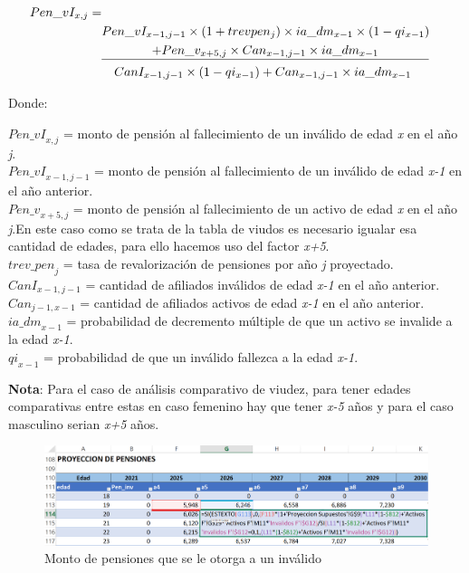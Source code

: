 \documentclass[
  letterpaper,
  DIV=11,
  numbers=noendperiod]{scrreprt}
\begin{document}
\begin{align}
Pen\_vI_{x,j} = \nonumber \\
& Pen\_vI_{x-1,j-1} \times \left (1+trevpen_j \right ) \times ia\_dm_{x-1}\times \left(1-qi_{x-1}\right) \nonumber \\
& \underline{\hspace{4 em}+Pen\_v_{x+5,j}\times Can_{x-1,j-1}\times ia\_dm_{x-1} \hspace{4 em}}\nonumber \\ 
&\hspace{1 em} CanI_{x-1,j-1}\times\left(1-qi_{x-1}\right)+Can_{x-1,j-1}\times ia\_dm_{x-1}
\end{align}

Donde:

\({Pen\_vI}_{x,j}\) = monto de pensión al fallecimiento de un inválido
de edad \emph{x} en el año \emph{j}.\\
\({Pen\_vI}_{x-1,j-1}\) = monto de pensión al fallecimiento de un
inválido de edad \emph{x-1} en el año anterior.\\
\({Pen\_v}_{x+5,j}\) = monto de pensión al fallecimiento de un activo de
edad \emph{x} en el año \emph{j}.En este caso como se trata de la tabla
de viudos es necesario igualar esa cantidad de edades, para ello hacemos
uso del factor \emph{x+5}.\\
\({trev\_{pen}}_j\) = tasa de revalorización de pensiones por año
\emph{j} proyectado.\\
\({CanI}_{x-1,j-1}\) = cantidad de afiliados inválidos de edad
\emph{x-1} en el año anterior.\\
\({Can}_{j-1,x-1}\) = cantidad de afiliados activos de edad \emph{x-1}
en el año anterior.\\
\({ia\_dm}_{x-1}\) = probabilidad de decremento múltiple de que un
activo se invalide a la edad \emph{x-1}.\\
\({qi}_{x-1}\) = probabilidad de que un inválido fallezca a la edad
\emph{x-1}.

\textbf{Nota}: Para el caso de análisis comparativo de viudez, para
tener edades comparativas entre estas en caso femenino hay que tener
\emph{x-5} años y para el caso masculino serian \emph{x+5} años.

\begin{figure}

{\centering \includegraphics{images/F/Img36.png}

}

\caption{Monto de pensiones que se le otorga a un inválido}

\end{figure}
\end{document}
